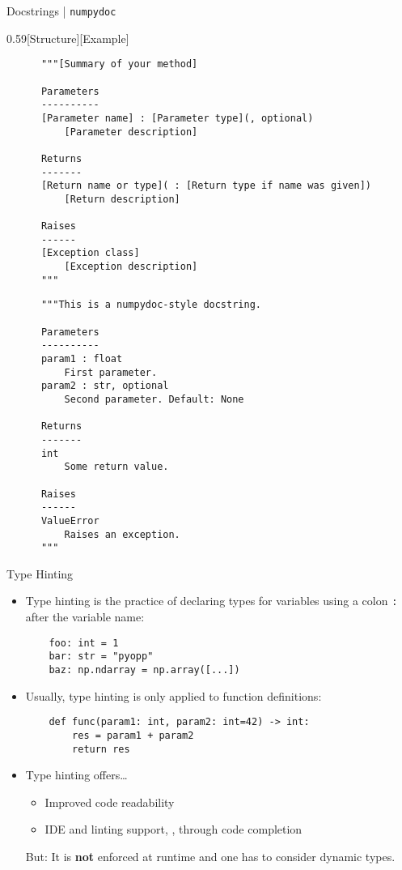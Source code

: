 \begin{frame}[fragile]{%
    Docstrings | \texttt{numpydoc}
    \hfill
  }
  \begin{CodeExplanation}{0.59}[Structure][Example]
    \footnotesize
    \begin{verbatim}
      """[Summary of your method]

      Parameters
      ----------
      [Parameter name] : [Parameter type](, optional)
          [Parameter description]

      Returns
      -------
      [Return name or type]( : [Return type if name was given])
          [Return description]

      Raises
      ------
      [Exception class]
          [Exception description]
      """
    \end{verbatim}
    \Explanation
    \footnotesize
    \begin{verbatim}
      """This is a numpydoc-style docstring.

      Parameters
      ----------
      param1 : float
          First parameter.
      param2 : str, optional
          Second parameter. Default: None

      Returns
      -------
      int
          Some return value.

      Raises
      ------
      ValueError
          Raises an exception.
      """
    \end{verbatim}
  \end{CodeExplanation}
\end{frame}

\begin{frame}[fragile]{
    Type Hinting
    \hfill
  }
  \begin{itemize}
    \setlength{\itemsep}{1.5em}
    \item Type hinting is the practice of declaring types for variables using a colon \texttt{:}
  after the variable name:
  \begin{verbatim}
    foo: int = 1
    bar: str = "pyopp"
    baz: np.ndarray = np.array([...])
  \end{verbatim}

  \item Usually, type hinting is only applied to function definitions:
  \begin{verbatim}
    def func(param1: int, param2: int=42) -> int:
        res = param1 + param2
        return res
  \end{verbatim}

  \item Type hinting offers\dots
  \begin{itemize}
    \item Improved code readability
    \item IDE and linting support, \eg{}, through code completion
  \end{itemize}
  But: It is \textbf{not} enforced at runtime and one has to consider dynamic types.
  \end{itemize}
\end{frame}

